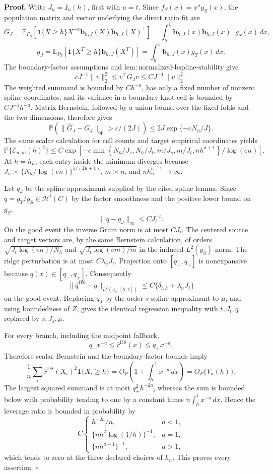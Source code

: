 \textbf{Proof.}
Write \(J_u=\mathsf J_u(h)\), first with \(u=t\).  Since \(f_S(x)=x^ag_S(x)\), the population matrix and vector underlying the direct ratio fit are
\[
G_J=\mathbb E_{P_S}\!\left[\mathbf 1\{X\ge h\}X^{-a}\mathbf b_{h,J}(X)\mathbf b_{h,J}(X)^\top\right]
=\int_h^1\mathbf b_{h,J}(x)\mathbf b_{h,J}(x)^\top g_S(x)\,dx,
\]
\[
g_J=\mathbb E_{P_T}\!\left[\mathbf 1\{X^T\ge h\}\mathbf b_{h,J}(X^T)\right]
=\int_h^1\mathbf b_{h,J}(x)g_T(x)\,dx.
\]
The boundary-factor assumptions and \(\mathrm{lem:normalized\text{-}bspline\text{-}stability}\) give
\[
cJ^{-1}\|v\|_2^2\le v^\top G_Jv\le CJ^{-1}\|v\|_2^2.
\]
The weighted summand is bounded by \(Ch^{-a}\), has only a fixed number of nonzero spline coordinates, and its variance in a boundary knot cell is bounded by \(CJ^{-1}h^{-a}\).  Matrix Bernstein, followed by a union bound over the fixed folds and the two dimensions, therefore gives
\[
\mathbb P\!\left(\|\widehat G_J-G_J\|_{\mathrm{op}}>c/(2J)\right)
\le 2J\exp\{-cN_h/J\}.
\]
The same scalar calculation for cell counts and target empirical coordinates yields
\[
\mathbb P\{\mathcal E_{n,m}(h)^c\}
\le C\exp\left[-c\min\left\{N_h/J_s,N_h/J_t,m/J_s,m/J_t,nh^{a+1}\right\}/\log(en)\right].
\]
At \(h=h_n\), each entry inside the minimum diverges because \(J_u\asymp\{N_h/\log(en)\}^{1/(2u+1)}\), \(m\asymp n\), and \(nh_n^{a+1}\to\infty\).

Let \(q_J\) be the spline approximant supplied by the cited spline lemma.  Since \(q=g_T/g_S\in\mathcal H^t(C)\) by the factor smoothness and the positive lower bound on \(g_S\),
\[
\|q-q_J\|_\infty\le CJ_t^{-t}.
\]
On the good event the inverse Gram norm is at most \(CJ_t\).  The centered source and target vectors are, by the same Bernstein calculation, of orders \(\sqrt{J_t\log(en)/N_h}\) and \(\sqrt{J_t\log(em)/m}\) in the induced \(L^2(g_S)\) norm.  The ridge perturbation is at most \(C\lambda_nJ_t\).  Projection onto \([q_-,q_+]\) is nonexpansive because \(q(x)\in[q_-,q_+]\).  Consequently
\[
\|\widehat q^{\mathrm{DS}}-q\|_{L^2(g_S;[h,1])}
\le C\{\delta_{t,h}+\lambda_nJ_t\}
\]
on the good event.  Replacing \(q_J\) by the order-\(s\) spline approximant to \(\mu\), and using boundedness of \(Z\), gives the identical regression inequality with \(t,J_t,q\) replaced by \(s,J_s,\mu\).

For every branch, including the midpoint fallback,
\[
q_-x^{-a}\le\widehat r^{\mathrm{DS}}(x)\le q_+x^{-a}.
\]
Therefore scalar Bernstein and the boundary-factor bounds imply
\[
\frac1n\sum_i\widehat r^{\mathrm{DS}}(X_i)^2\mathbf 1\{X_i\ge h\}
=O_P\left(1+\int_h^1x^{-a}\,dx\right)=O_P\{V_a(h)\}.
\]
The largest squared summand is at most \(q_+^2h^{-2a}\), whereas the sum is bounded below with probability tending to one by a constant times \(n\int_h^1x^{-a}\,dx\).  Hence the leverage ratio is bounded in probability by
\[
C\begin{cases}
h^{-2a}/n,&a<1,\\
\{nh^2\log(1/h)\}^{-1},&a=1,\\
\{nh^{a+1}\}^{-1},&a>1,
\end{cases}
\]
which tends to zero at the three declared choices of \(h_n\).  This proves every assertion. \(\square\)
